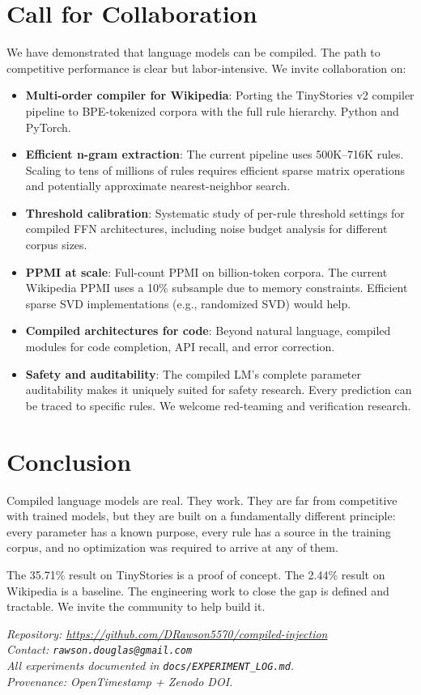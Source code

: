 \documentclass[11pt,a4paper]{article}
\begin{document}
\section{Call for Collaboration}

We have demonstrated that language models can be compiled. The path to competitive performance
is clear but labor-intensive. We invite collaboration on:

\begin{itemize}[leftmargin=*]
\item \textbf{Multi-order compiler for Wikipedia}: Porting the TinyStories v2 compiler pipeline to BPE-tokenized corpora with the full rule hierarchy. Python and PyTorch.
\item \textbf{Efficient n-gram extraction}: The current pipeline uses 500K--716K rules. Scaling to tens of millions of rules requires efficient sparse matrix operations and potentially approximate nearest-neighbor search.
\item \textbf{Threshold calibration}: Systematic study of per-rule threshold settings for compiled FFN architectures, including noise budget analysis for different corpus sizes.
\item \textbf{PPMI at scale}: Full-count PPMI on billion-token corpora. The current Wikipedia PPMI uses a 10\% subsample due to memory constraints. Efficient sparse SVD implementations (e.g., randomized SVD) would help.
\item \textbf{Compiled architectures for code}: Beyond natural language, compiled modules for code completion, API recall, and error correction.
\item \textbf{Safety and auditability}: The compiled LM's complete parameter auditability makes it uniquely suited for safety research. Every prediction can be traced to specific rules. We welcome red-teaming and verification research.
\end{itemize}

\section{Conclusion}

Compiled language models are real. They work. They are far from competitive with trained models,
but they are built on a fundamentally different principle: every parameter has a known purpose,
every rule has a source in the training corpus, and no optimization was required to arrive at
any of them.

The 35.71\% result on TinyStories is a proof of concept. The 2.44\% result on Wikipedia is a
baseline. The engineering work to close the gap is defined and tractable. We invite the
community to help build it.

\vspace{1em}
\noindent\textit{Repository: \url{https://github.com/DRawson5570/compiled-injection}}\\
\textit{Contact: \texttt{rawson.douglas@gmail.com}}\\
\textit{All experiments documented in \texttt{docs/EXPERIMENT\_LOG.md}.}\\
\textit{Provenance: OpenTimestamp + Zenodo DOI.}
\end{document}
